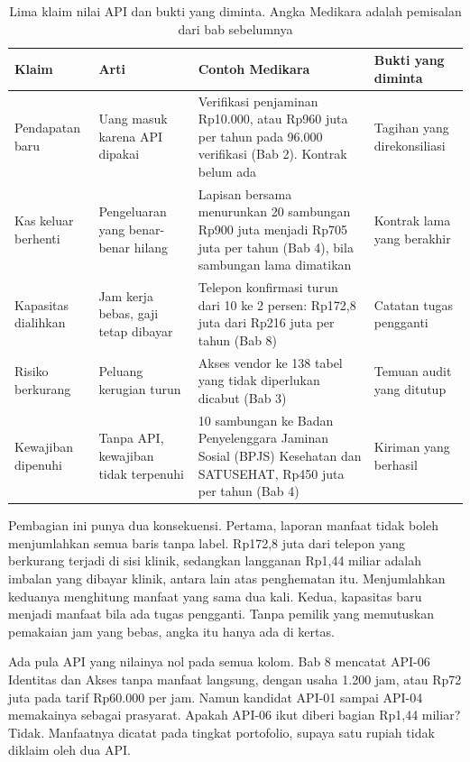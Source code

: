 \begin{table}[!htb]
  \centering
  \caption{Lima klaim nilai API dan bukti yang diminta. Angka Medikara adalah pemisalan dari bab sebelumnya}
  \label{tab:ch12-jenis-nilai}
  \footnotesize
  \begin{tabularx}{\textwidth}{H{2.15cm}GGH{2.7cm}}
    \hline
    \textbf{Klaim} & \textbf{Arti} & \textbf{Contoh Medikara} & \textbf{Bukti yang diminta} \\ \hline
    Pendapatan baru & Uang masuk karena API dipakai & Verifikasi penjaminan Rp10.000, atau Rp960 juta per tahun pada 96.000 verifikasi (Bab 2). Kontrak belum ada & Tagihan yang direkonsiliasi \\ \hline
    Kas keluar berhenti & Pengeluaran yang benar-benar hilang & Lapisan bersama menurunkan 20 sambungan Rp900 juta menjadi Rp705 juta per tahun (Bab 4), bila sambungan lama dimatikan & Kontrak lama yang berakhir \\ \hline
    Kapasitas dialihkan & Jam kerja bebas, gaji tetap dibayar & Telepon konfirmasi turun dari 10 ke 2 persen: Rp172,8 juta dari Rp216 juta per tahun (Bab 8) & Catatan tugas pengganti \\ \hline
    Risiko berkurang & Peluang kerugian turun & Akses vendor ke 138 tabel yang tidak diperlukan dicabut (Bab 3) & Temuan audit yang ditutup \\ \hline
    Kewajiban dipenuhi & Tanpa API, kewajiban tidak terpenuhi & 10 sambungan ke Badan Penyelenggara Jaminan Sosial (BPJS) Kesehatan dan SATUSEHAT, Rp450 juta per tahun (Bab 4) & Kiriman yang berhasil \\ \hline
  \end{tabularx}
\end{table}

Pembagian ini punya dua konsekuensi. Pertama, laporan manfaat tidak boleh menjumlahkan semua baris tanpa label. Rp172,8 juta dari
telepon yang berkurang terjadi di sisi klinik, sedangkan langganan Rp1,44 miliar adalah imbalan yang dibayar klinik, antara lain
atas penghematan itu. Menjumlahkan keduanya menghitung manfaat yang sama dua kali. Kedua, kapasitas baru menjadi manfaat bila ada
tugas pengganti. Tanpa pemilik yang memutuskan pemakaian jam yang bebas, angka itu hanya ada di kertas.

Ada pula API yang nilainya nol pada semua kolom. Bab 8 mencatat API-06 Identitas dan Akses tanpa manfaat langsung, dengan usaha
1.200 jam, atau Rp72 juta pada tarif Rp60.000 per jam. Namun kandidat API-01 sampai API-04 memakainya sebagai prasyarat. Apakah
API-06 ikut diberi bagian Rp1,44 miliar? Tidak. Manfaatnya dicatat pada tingkat portofolio, supaya satu rupiah tidak diklaim oleh
dua API.

